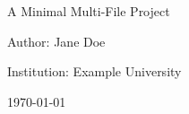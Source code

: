 \begin{titlepage}
    \centering
    {\LARGE \projname\par}
    \vspace{1.5cm}
    {\Large A Minimal Multi-File Project\par}
    \vspace{1cm}
    {\large Author: Jane Doe\par}
    {\large Institution: Example University\par}
    \vfill
    {\large \today\par}
    \end{titlepage}
    